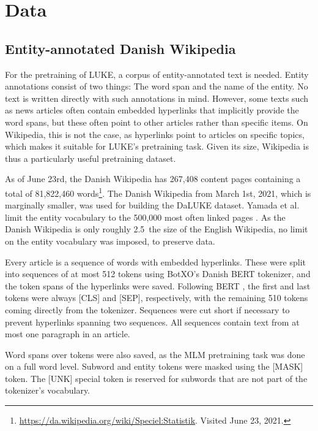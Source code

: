 \documentclass[main.tex]{subfiles}
\begin{document}
\chapter{Data}
\label{chap:data}

\section{Entity-annotated Danish Wikipedia}
\label{sec:dawiki}
For the pretraining of LUKE, a corpus of entity-annotated text is needed.
Entity annotations consist of two things: The word span and the name of the entity.
No text is written directly with such annotations in mind.
However, some texts such as news articles often contain embedded hyperlinks that implicitly provide the word spans, but these often point to other articles rather than specific items.
On Wikipedia, this is not the case, as hyperlinks point to articles on specific topics, which makes it suitable for LUKE's pretraining task.
Given its size, Wikipedia is thus a particularly useful pretraining dataset.

As of June 23rd, the Danish Wikipedia has 267,408 content pages containing a total of 81,822,460 words\footnote{\url{https://da.wikipedia.org/wiki/Speciel:Statistik}. Visited June 23, 2021.}.
The Danish Wikipedia from March 1st, 2021, which is marginally smaller, was used for building the DaLUKE dataset.
Yamada et al. limit the entity vocabulary to the 500,000 most often linked pages \cite{yamada2020luke}.
As the Danish Wikipedia is only roughly 2.5\pro\ the size of the English Wikipedia, no limit on the entity vocabulary was imposed, to preserve data.

Every article is a sequence of words with embedded hyperlinks.
These were split into sequences of at most 512 tokens using BotXO's Danish BERT tokenizer, and the token spans of the hyperlinks were saved.
Following BERT \cite{devlin2019bert}, the first and last tokens were always [CLS] and [SEP], respectively, with the remaining 510 tokens coming directly from the tokenizer.
Sequences were cut short if necessary to prevent hyperlinks spanning two sequences.
All sequences contain text from at most one paragraph in an article.

Word spans over tokens were also saved, as the MLM pretraining task was done on a full word level.
Subword and entity tokens were masked using the [MASK] token.
The [UNK] special token is reserved for subwords that are not part of the tokenizer's vocabulary.
\end{document}
